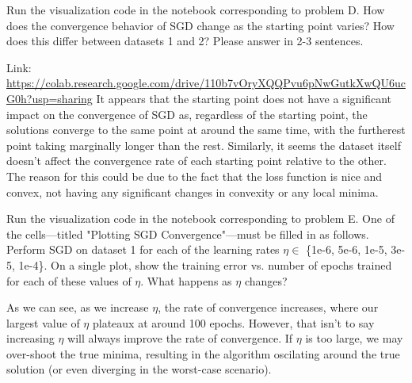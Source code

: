 \begin{problem}[2]
  Run the visualization code in the notebook corresponding to problem D. How does the convergence behavior of SGD change as the starting point varies? How does this differ between datasets 1 and 2? Please answer in 2-3 sentences.
\end{problem}
\begin{solution}
  Link: \url{https://colab.research.google.com/drive/110b7vOryXQQPvu6pNwGutkXwQU6ucG0h?usp=sharing}
 It appears that the starting point does not have a significant impact on the convergence of SGD as, regardless of the starting point, the solutions converge to the same point at around the same time, with the furtherest point taking marginally longer than the rest. Similarly, it seems the dataset itself doesn't affect the convergence rate of each starting point relative to the other. The reason for this could be due to the fact that the loss function is nice and convex, not having any significant changes in convexity or any local minima.
\end{solution}

\begin{problem}[6]
  Run the visualization code in the notebook corresponding to problem E. One of the cells---titled "Plotting SGD Convergence"---must be filled in as follows. Perform SGD on dataset 1 for each of the learning rates $\eta \in$ \{1e-6, 5e-6, 1e-5, 3e-5, 1e-4\}. On a single plot, show the training error vs. number of epochs trained for each of these values of $\eta$. What happens as $\eta$ changes?
\end{problem}

\begin{solution}
 \begin{figure}[H]
 \end{figure}
 As we can see, as we increase $\eta$, the rate of convergence increases, where our largest value of $\eta$ plateaux at around 100 epochs. However, that isn't to say increasing $\eta$ will always improve the rate of convergence. If $\eta$ is too large, we may over-shoot the true minima, resulting in the algorithm oscilating around the true solution (or even diverging in the worst-case scenario).
\end{solution}



